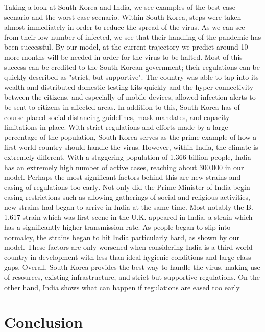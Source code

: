 \documentclass[a4paper,10pt]{article}
\begin{document}
Taking a look at South Korea and India, we see examples of the best case scenario and the worst case scenario. Within South Korea, steps were taken almost immediately in order to reduce the spread of the virus. As we can see from their low number of infected, we see that their handling of the pandemic has been successful. By our model, at the current trajectory we predict around 10 more months will be needed in order for the virus to be halted. Most of this success can be credited to the South Korean government; their regulations can be quickly described as "strict, but supportive"\textsuperscript{\cite{SKDisc}}. The country was able to tap into its wealth and distributed domestic testing kits quickly and the hyper connectivity between the citizens, and especially of mobile devices, allowed infection alerts to be sent to citizens in affected areas. In addition to this, South Korea has of course placed social distancing guidelines, mask mandates, and capacity limitations in place. With strict regulations and efforts made by a large percentage of the population, South Korea serves as the prime example of how a first world country should handle the virus. However, within India, the climate is extremely different. With a staggering population of 1.366 billion people, India has an extremely high number of active cases, reaching about 300,000 in our model. Perhaps the most significant factors behind this are new strains and easing of regulations too early\textsuperscript{\cite{IndiaDisc1}}\textsuperscript{\cite{IndiaDisc2}}. Not only did the Prime Minister of India begin easing restrictions such as allowing gatherings of social and religious activities, new strains had began to arrive in India at the same time. Most notably the B. 1.617 strain which was first scene in the U.K. appeared in India, a strain which has a significantly higher transmission rate. As people began to slip into normalcy, the strains began to hit India particularly hard, as shown by our model. These factors are only worsened when considering India is a third world country in development with less than ideal hygienic conditions and large class gaps. Overall, South Korea provides the best way to handle the virus, making use of resources, existing infrastructure, and strict but supportive regulations. On the other hand, India shows what can happen if regulations are eased too early
\clearpage
\section{Conclusion}
\end{document}
